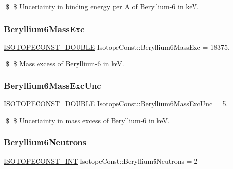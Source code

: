 \$ \$ Uncertainty in binding energy per A of Beryllium-\/6 in keV. \mbox{\label{group___isotope_const-_beryllium-_be6_ga3ec4d853e0612243bc7aa7ddb176aac5}} 
\subsubsection{\texorpdfstring{Beryllium6\+Mass\+Exc}{Beryllium6MassExc}}
{\footnotesize\ttfamily \mbox{\hyperlink{group___isotope_const-_macros_ga8f45a7272ce02c0b4c65c44636ed719a}{I\+S\+O\+T\+O\+P\+E\+C\+O\+N\+S\+T\+\_\+\+D\+O\+U\+B\+LE}} Isotope\+Const\+::\+Beryllium6\+Mass\+Exc = 18375.}

\$ \$ Mass excess of Beryllium-\/6 in keV. \mbox{\label{group___isotope_const-_beryllium-_be6_ga8b0d1715ff59d26abdc2781b6bd7c9da}} 
\subsubsection{\texorpdfstring{Beryllium6\+Mass\+Exc\+Unc}{Beryllium6MassExcUnc}}
{\footnotesize\ttfamily \mbox{\hyperlink{group___isotope_const-_macros_ga8f45a7272ce02c0b4c65c44636ed719a}{I\+S\+O\+T\+O\+P\+E\+C\+O\+N\+S\+T\+\_\+\+D\+O\+U\+B\+LE}} Isotope\+Const\+::\+Beryllium6\+Mass\+Exc\+Unc = 5.}

\$ \$ Uncertainty in mass excess of Beryllium-\/6 in keV. \mbox{\label{group___isotope_const-_beryllium-_be6_gada28c5a9852d05785c00c0d9d01d6c1b}} 
\subsubsection{\texorpdfstring{Beryllium6\+Neutrons}{Beryllium6Neutrons}}
{\footnotesize\ttfamily \mbox{\hyperlink{group___isotope_const-_macros_ga5f18360b3e99483a35c32d789e62621c}{I\+S\+O\+T\+O\+P\+E\+C\+O\+N\+S\+T\+\_\+\+I\+NT}} Isotope\+Const\+::\+Beryllium6\+Neutrons = 2}

